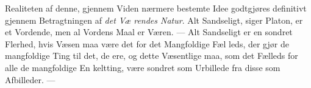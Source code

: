\documentclass[12pt,a4paper]{book}
\newcommand{\divrule}{\begin{center}\rule{2cm}{0.4pt}\end{center}}
\begin{document}
Realiteten af denne, gjennem Viden nærmere bestemte
Idee godtgjøres definitivt gjennem Betragtningen af \emph{det Væ\-%
rendes Natur}. Alt Sandseligt, siger Platon, er et Vordende,
men al Vordens Maal er Væren. --- Alt Sandseligt er en sondret
Flerhed, hvis Væsen maa være det for det Mangfoldige Fæl\-%
leds, der gjør de mangfoldige Ting til det, de ere, og dette
Væsentlige maa, som det Fælleds for alle de mangfoldige En\-%
keltting, være sondret som Urbillede fra disse som Afbilleder. ---
\end{document}
